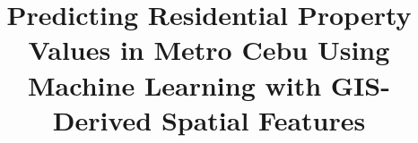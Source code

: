 \documentclass[man, 12pt, letterpaper, floatsintext]{apa7}
\title{Predicting Residential Property Values in Metro Cebu Using Machine Learning with GIS-Derived Spatial Features}
\begin{document}
\maketitle







\nocite{*}
\printbibliography
\end{document}
